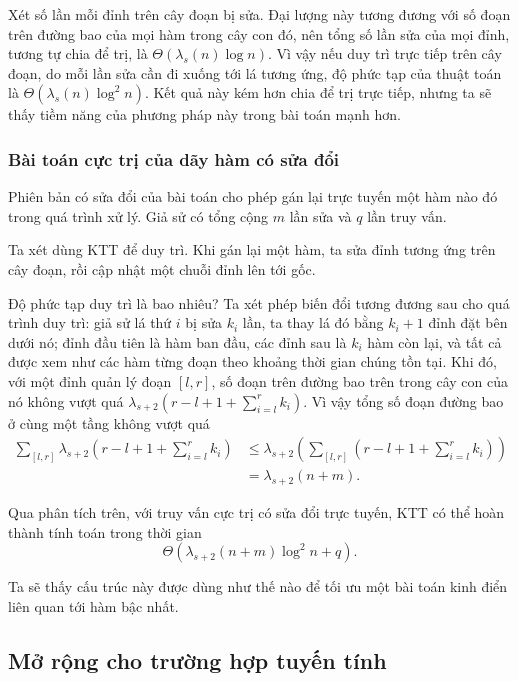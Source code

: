 \documentclass[11pt]{article}
\begin{document}
Xét số lần mỗi đỉnh trên cây đoạn bị sửa. Đại lượng này tương đương với số đoạn
trên đường bao của mọi hàm trong cây con đó, nên tổng số lần sửa của mọi đỉnh,
tương tự chia để trị, là \(\Theta(\lambda_s(n)\log n)\). Vì vậy nếu duy trì trực
tiếp trên cây đoạn, do mỗi lần sửa cần đi xuống tới lá tương ứng, độ phức tạp
của thuật toán là \(\Theta(\lambda_s(n)\log^2 n)\). Kết quả này kém hơn chia để
trị trực tiếp, nhưng ta sẽ thấy tiềm năng của phương pháp này trong bài toán
mạnh hơn.

\subsubsection{Bài toán cực trị của dãy hàm có sửa đổi}

Phiên bản có sửa đổi của bài toán cho phép gán lại trực tuyến một hàm nào đó
trong quá trình xử lý. Giả sử có tổng cộng \(m\) lần sửa và \(q\) lần truy vấn.

Ta xét dùng KTT để duy trì. Khi gán lại một hàm, ta sửa đỉnh tương ứng trên cây
đoạn, rồi cập nhật một chuỗi đỉnh lên tới gốc.

Độ phức tạp duy trì là bao nhiêu? Ta xét phép biến đổi tương đương sau cho quá
trình duy trì: giả sử lá thứ \(i\) bị sửa \(k_i\) lần, ta thay lá đó bằng
\(k_i+1\) đỉnh đặt bên dưới nó; đỉnh đầu tiên là hàm ban đầu, các đỉnh sau là
\(k_i\) hàm còn lại, và tất cả được xem như các hàm từng đoạn theo khoảng thời
gian chúng tồn tại. Khi đó, với một đỉnh quản lý đoạn \([l,r]\), số đoạn trên
đường bao trên trong cây con của nó không vượt quá
\(\lambda_{s+2}(r-l+1+\sum_{i=l}^r k_i)\). Vì vậy tổng số đoạn đường bao ở cùng
một tầng không vượt quá
\[
\begin{aligned}
\sum_{[l,r]}\lambda_{s+2}\left(r-l+1+\sum_{i=l}^r k_i\right)
&\le
\lambda_{s+2}\left(\sum_{[l,r]}\left(r-l+1+\sum_{i=l}^r k_i\right)\right)\\
&=\lambda_{s+2}(n+m).
\end{aligned}
\]

Qua phân tích trên, với truy vấn cực trị có sửa đổi trực tuyến, KTT có thể hoàn
thành tính toán trong thời gian
\[
  \Theta(\lambda_{s+2}(n+m)\log^2 n+q).
\]

Ta sẽ thấy cấu trúc này được dùng như thế nào để tối ưu một bài toán kinh điển
liên quan tới hàm bậc nhất.

\subsection{Mở rộng cho trường hợp tuyến tính}
\end{document}
